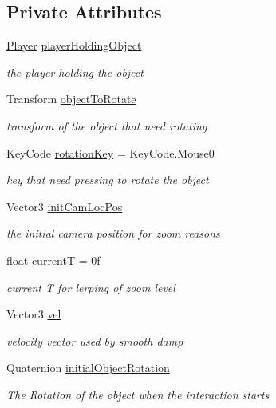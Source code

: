 \subsection*{Private Attributes}
\begin{DoxyCompactItemize}
\item 
\mbox{\hyperlink{class_player}{Player}} \mbox{\hyperlink{class_object_in_hand_component_add0e2bed573b54275914fc48c37b958c}{player\+Holding\+Object}}
\begin{DoxyCompactList}\small\item\em the player holding the object \end{DoxyCompactList}\item 
Transform \mbox{\hyperlink{class_object_in_hand_component_adbeb015fd1ac714798d886db0b6f940a}{object\+To\+Rotate}}
\begin{DoxyCompactList}\small\item\em transform of the object that need rotating \end{DoxyCompactList}\item 
Key\+Code \mbox{\hyperlink{class_object_in_hand_component_aa84650b4fd81b0c4aa0bc91d2a371625}{rotation\+Key}} = Key\+Code.\+Mouse0
\begin{DoxyCompactList}\small\item\em key that need pressing to rotate the object \end{DoxyCompactList}\item 
Vector3 \mbox{\hyperlink{class_object_in_hand_component_a002cb792e31eb3f99e15c126a07fa67b}{init\+Cam\+Loc\+Pos}}
\begin{DoxyCompactList}\small\item\em the initial camera position for zoom reasons \end{DoxyCompactList}\item 
float \mbox{\hyperlink{class_object_in_hand_component_a173143fff5ee217d1148281e49f26e10}{currentT}} = 0f
\begin{DoxyCompactList}\small\item\em current T for lerping of zoom level \end{DoxyCompactList}\item 
Vector3 \mbox{\hyperlink{class_object_in_hand_component_abbcf3780d099790d8d2e799ab4447ec6}{vel}}
\begin{DoxyCompactList}\small\item\em velocity vector used by smooth damp \end{DoxyCompactList}\item 
Quaternion \mbox{\hyperlink{class_object_in_hand_component_a0dcb3b1519006abc8524c6d913069292}{initial\+Object\+Rotation}}
\begin{DoxyCompactList}\small\item\em The Rotation of the object when the interaction starts \end{DoxyCompactList}\end{DoxyCompactItemize}


